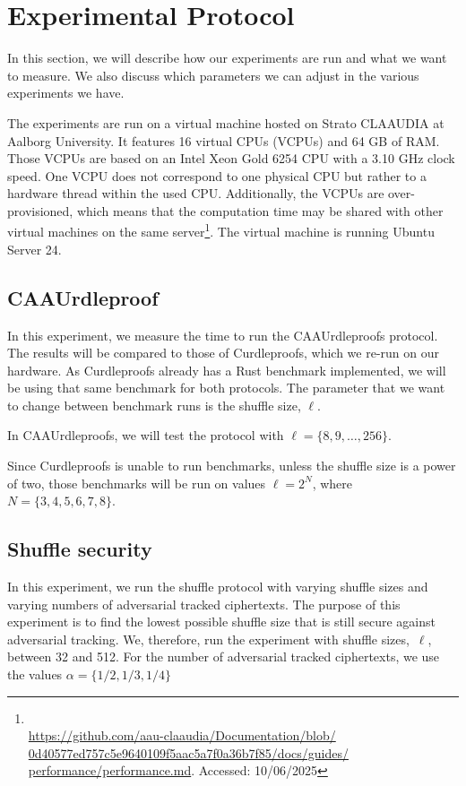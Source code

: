 
\section{Experimental Protocol}\label{sec:experimental-protocol}
In this section, we will describe how our experiments are run and what we want to measure.
We also discuss which parameters we can adjust in the various experiments we have.

The experiments are run on a virtual machine hosted on Strato CLAAUDIA at Aalborg University.
It features 16 virtual CPUs (VCPUs) and 64 GB of RAM\@.
Those VCPUs are based on an Intel Xeon Gold 6254 CPU with a 3.10 GHz clock speed.
One VCPU does not correspond to one physical CPU but rather to a hardware thread within the used CPU\@.
Additionally, the VCPUs are over-provisioned, which means that the computation time may be shared with other virtual machines on the same server\footnote{\\ \href{https://github.com/aau-claaudia/Documentation/blob/0d40577ed757c5e9640109f5aac5a7f0a36b7f85/docs/guides/performance/performance.md}{https://github.com/aau-claaudia/Documentation/blob/\\0d40577ed757c5e9640109f5aac5a7f0a36b7f85/docs/guides/\\performance/performance.md}. Accessed: 10/06/2025}.
The virtual machine is running Ubuntu Server 24.


\subsection{CAAUrdleproof}\label{sec:CAAUrdleproof-experiment}
In this experiment, we measure the time to run the CAAUrdleproofs protocol.
The results will be compared to those of Curdleproofs, which we re-run on our hardware.
As Curdleproofs already has a Rust benchmark implemented, we will be using that same benchmark for both protocols.
The parameter that we want to change between benchmark runs is the shuffle size, $\ell$.

In CAAUrdleproofs, we will test the protocol with $\ell=\{8,9,\dots,256\}$.

Since Curdleproofs is unable to run benchmarks, unless the shuffle size is a power of two, those benchmarks will be run on values $\ell=2^N$, where $N=\{3,4,5,6,7,8\}$.




\subsection{Shuffle security}\label{subsec:experimental-protocol-shuffle-security}
In this experiment, we run the shuffle protocol with varying shuffle sizes and varying numbers of adversarial tracked ciphertexts.
The purpose of this experiment is to find the lowest possible shuffle size that is still secure against adversarial tracking.
We, therefore, run the experiment with shuffle sizes,~$\ell$, between 32 and 512.
For the number of adversarial tracked ciphertexts, we use the values $\alpha=\{1/2,1/3,1/4\}$

